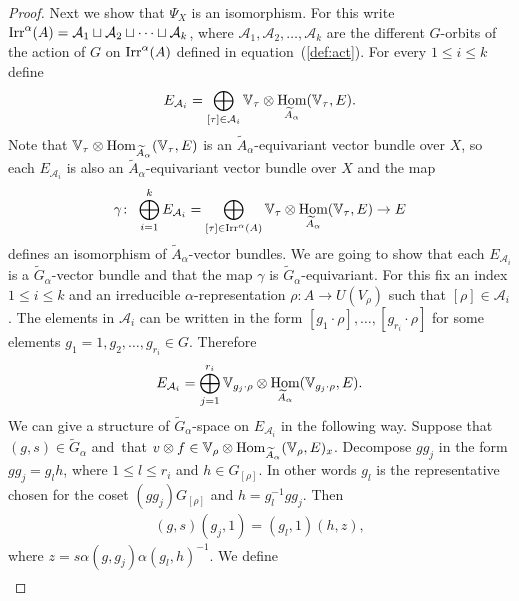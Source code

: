 \documentclass[pdftex]{sigma}
\def\V{\mathbb{V}}
\DeclareMathOperator{\Hom}{\textup{Hom}}
\DeclareMathOperator{\Irr}{\textup{Irr}}
\theoremstyle{definition}
\numberwithin{equation}{section}
\begin{document}
\begin{proof}
Next we show that $\Psi_{X}$ is an isomorphism. For this write $\Irr^{\alpha}(A)=
\mathcal{A}_{1}\sqcup\mathcal{A}_{2}\sqcup\dots \sqcup\mathcal{A}_{k}$, where
$\mathcal{A}_{1},\mathcal{A}_{2},\dots, \mathcal{A}_{k}$ are the different
$G$-orbits of the action of $G$ on $\Irr^{\alpha}(A)$ defined in equation~(\ref{def:act}).
For every $1\leq i\leq k$ define
\begin{gather*}
E_{\mathcal{A}_{i}}=\bigoplus_{[\tau]\in \mathcal{A}_{i}}
\V_{\tau}\otimes \Hom_{\widetilde{A}_{\alpha}}(\V_{\tau},E).
\end{gather*}
Note that $\V_{\tau}\otimes \Hom_{\widetilde{A}_{\alpha}}(\V_{\tau},E)$ is an
$\widetilde{A}_{\alpha}$-equivariant vector bundle over $X$, so each
$E_{\mathcal{A}_{i}}$ is also an $\widetilde{A}_{\alpha}$-equivariant vector bundle over $X$
and the map
\begin{gather*}
\gamma\colon\ \bigoplus_{i=1}^{k}E_{\mathcal{A}_{i}}=\bigoplus_{[\tau]\in \Irr^{\alpha}(A)}
\V_{\tau}\otimes \Hom_{\widetilde{A}_{\alpha}}(\V_{\tau},E)\rightarrow E
\end{gather*}
defines an isomorphism of $\widetilde{A}_{\alpha}$-vector bundles. We are going to show that each
$E_{\mathcal{A}_{i}}$ is a $\widetilde{G}_{\alpha}$-vector bundle and that the map $\gamma$ is
$\widetilde{G}_{\alpha}$-equivariant. For this fix an index $1\leq i\leq k$ and an irreducible
$\alpha$-representation $\rho\colon A\rightarrow U(V_{\rho})$ such that
$[\rho]\in\mathcal{A}_{i}$. The elements in $\mathcal{A}_{i}$ can be written in the
form $[g_{1}\cdot\rho], \dots, [g_{r_{i}}\cdot\rho]$ for some elements
$g_{1}=1,g_{2},\dots,g_{r_{i}}\in G$. Therefore
\begin{gather*}
E_{\mathcal{A}_{i}}=\bigoplus_{j=1}^{r_{i}}\V_{g_{j}\cdot\rho}\otimes
\Hom_{\widetilde{A}_{\alpha}}(\V_{g_{j}\cdot\rho},E).
\end{gather*}
We can give a structure of
$\widetilde{G}_{\alpha}$-space on $E_{\mathcal{A}_{i}}$ in the following way.
Suppose that $(g,s)\in\widetilde{G}_{\alpha}$ and~that
$v\otimes f\in \V_{\rho}\otimes \Hom_{\widetilde{A}_{\alpha}}(\V_{\rho},E)_{x}$.
Decompose $gg_{j}$ in the form $gg_{j}=g_{l}h$, where $1\leq l\leq r_{i}$ and $h\in G_{[\rho]}$.
In other words $g_{l}$ is the representative chosen for the coset
$(gg_{j})G_{[\rho]}$ and $h=g_{l}^{-1}gg_{j}$. Then
\begin{gather*}
(g,s)(g_{j},1)=(g_{l},1)(h,z),
\end{gather*}
where $z=s\alpha(g,g_{j})\alpha(g_{l},h)^{-1}$. We define
\begin{gather*}

\end{gather*}
\end{proof}
\end{document}
